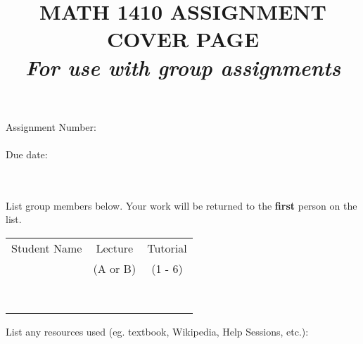 \documentclass[12pt,letterpaper]{article}
\title{MATH 1410 ASSIGNMENT COVER PAGE\\
\textit{For use with group assignments}}
\date{}
\begin{document}
\maketitle
\large
\begin{tabbing}
Assignment Number: \= \underline{\hspace{1in}}\\
\\
Due date: \> \underline{\hspace{4in}}\\
\\
\\
\end{tabbing}

\noindent List group members below. Your work will be returned to the \textbf{first} person on the list.\\

\bigskip

\begin{tabular}{ccc}
 Student Name & Lecture& Tutorial\\
 & (A or B) & (1 - 6)\\
&&\\
\underline{\hspace{3in}} & \underline{\hspace{1in}} & \underline{\hspace{1in}}\\
&&\\
\underline{\hspace{3in}} & \underline{\hspace{1in}} & \underline{\hspace{1in}}\\
&&\\
\underline{\hspace{3in}} & \underline{\hspace{1in}} & \underline{\hspace{1in}}\\
&&\\
\underline{\hspace{3in}} & \underline{\hspace{1in}} & \underline{\hspace{1in}}
\end{tabular}


\bigskip


\bigskip

\noindent List any resources used (eg. textbook, Wikipedia, Help Sessions, etc.):
\end{document}
